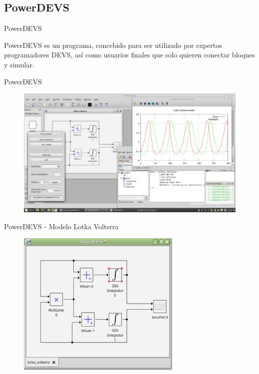 \documentclass[10pt,handout]{beamer}
\begin{document}
	\subsection{PowerDEVS}

\begin{frame}{PowerDEVS}
\begin{block}{PowerDEVS} 
 es un programa, concebido para ser utilizado por expertos programadores DEVS, así como usuarios finales que solo quieren 
	conectar bloques y simular.
\end{block}
\end{frame}

\begin{frame}{PowerDEVS}
	\begin{figure}[H]
	  \includegraphics[width=\textwidth]{powerdevs}
	\end{figure}
\end{frame}

\begin{frame}{PowerDEVS - Modelo Lotka Volterra}
\centering
\begin{figure}[H]
	  \includegraphics[width=0.7\textwidth]{lk-powerdevs}
\end{figure}
\end{frame}
\end{document}
